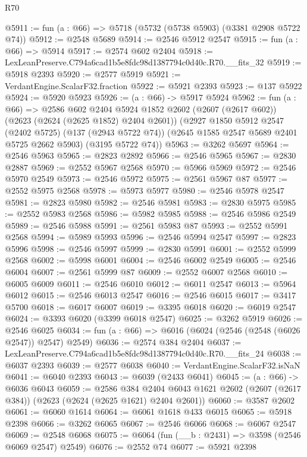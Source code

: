 \begin{lexlean}{R70}
\begin{coremodule}
@5911 := fun (a : @66) => @5718 (@5732 (@5738 @5903) (@3381 @2908 @5722 @74))
@5912 := @2548 @5689
@5914 := @2546 @5912 @2547
@5915 := fun (a : @66) => @5914
@5917 := @2574 @602 @2404
@5918 := LexLeanPreserve.C794a6cad1b5e8fdc98d1387794c0d40c.R70.__fits_32
@5919 := @5918 @2393
@5920 := @2577 @5919
@5921 := VerdantEngine.ScalarF32.fraction
@5922 := @5921 @2393
@5923 := @137 @5922
@5924 := @5920 @5923
@5926 := (a : @66) -> @5917 @5924
@5962 := fun (a : @66) =>
  @2586
    @602
    @2404
    @5924
    @1852
    @2602
    (@2607 (@2617 @602))
    (@2623 (@2624 (@2625 @1852) @2404 @2601))
    (@2927
      @1850
      @5912
      @2547
      (@2402 @5725)
      (@137 (@2943 @5722 @74))
      (@2645 @1585 @2547 @5689 @2401 @5725 @2662 @5903)
      (@3195 @5722 @74))
@5963 := @3262 @5697
@5964 := @2546 @5963
@5965 := @2823 @2892
@5966 := @2546 @5965
@5967 := @2830 @2887
@5969 := @2552 @5967 @2568
@5970 := @5966 @5969
@5972 := @2546 @5970 @2549
@5973 := @2546 @5972
@5975 := @2561 @5967 @87
@5977 := @2552 @5975 @2568
@5978 := @5973 @5977
@5980 := @2546 @5978 @2547
@5981 := @2823 @5980
@5982 := @2546 @5981
@5983 := @2830 @5975
@5985 := @2552 @5983 @2568
@5986 := @5982 @5985
@5988 := @2546 @5986 @2549
@5989 := @2546 @5988
@5991 := @2561 @5983 @87
@5993 := @2552 @5991 @2568
@5994 := @5989 @5993
@5996 := @2546 @5994 @2547
@5997 := @2823 @5996
@5998 := @2546 @5997
@5999 := @2830 @5991
@6001 := @2552 @5999 @2568
@6002 := @5998 @6001
@6004 := @2546 @6002 @2549
@6005 := @2546 @6004
@6007 := @2561 @5999 @87
@6009 := @2552 @6007 @2568
@6010 := @6005 @6009
@6011 := @2546 @6010
@6012 := @6011 @2547
@6013 := @5964 @6012
@6015 := @2546 @6013 @2547
@6016 := @2546 @6015
@6017 := @3417 @5700
@6018 := @6017 @6007
@6019 := @3395 @6018
@6020 := @6019 @2547
@6024 := @3393 @6020 (@3399 @6018 @2547)
@6025 := @3262 @5919
@6026 := @2546 @6025
@6034 := fun (a : @66) => @6016 (@6024 (@2546 (@2548 (@6026 @2547)) @2547) @2549)
@6036 := @2574 @384 @2404
@6037 := LexLeanPreserve.C794a6cad1b5e8fdc98d1387794c0d40c.R70.__fits_24
@6038 := @6037 @2393
@6039 := @2577 @6038
@6040 := VerdantEngine.ScalarF32.isNaN
@6041 := @6040 @2393
@6043 := @6039 (@2433 @6041)
@6045 := (a : @66) -> @6036 @6043
@6059 := @2586
    @384
    @2404
    @6043
    @1621
    @2602
    (@2607 (@2617 @384))
    (@2623 (@2624 (@2625 @1621) @2404 @2601))
@6060 := @3587 @2602
@6061 := @6060 @1614
@6064 := @6061 @1618 @433 @6015
@6065 := @5918 @2398
@6066 := @3262 @6065
@6067 := @2546 @6066
@6068 := @6067 @2547
@6069 := @2548 @6068
@6075 := @6064 (fun (__b : @2431) => @3598 (@2546 @6069 @2547) @2549)
@6076 := @2552 @74
@6077 := @5921 @2398

\end{coremodule}
\end{lexlean}
